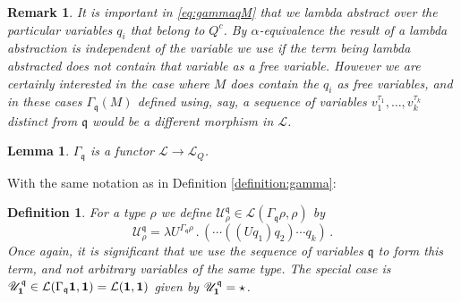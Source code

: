 \documentclass[english,letter paper,12pt,leqno]{article}
\def\be{\begin{equation}}
\def\ee{\end{equation}}
\def\ldot{\,.\,}
\newtheorem{lemma}[theorem]{Lemma}
\theoremstyle{example}
\newtheorem{definition}[theorem]{Definition}
\newtheorem{remark}[theorem]{Remark}
\numberwithin{equation}{section}
\newcommand{\call}[1]{\mathcal{#1}}
\def\be{\begin{equation}}
\def\ee{\end{equation}}
\def\ldot{\,.\,}
\begin{document}
\begin{remark} It is important in \eqref{eq:gammaqM} that we lambda abstract over the particular variables $q_i$ that belong to $Q^c$. By $\alpha$-equivalence the result of a lambda abstraction is independent of the variable we use \emph{if} the term being lambda abstracted does not contain that variable as a free variable. However we are certainly interested in the case where $M$ \emph{does} contain the $q_i$ as free variables, and in these cases $\Gamma_\mathfrak{q}(M)$ defined using, say, a sequence of variables $v_1^{\tau_1},\ldots,v_k^{\tau_k}$ distinct from $\mathfrak{q}$ would be a different morphism in $\call{L}$.
\end{remark}
\begin{lemma}\label{lem:gamfuncto} $\Gamma_\mathfrak{q}$ is a functor $\call{L} \longrightarrow \call{L}_Q$.
\end{lemma}
With the same notation as in Definition \ref{definition:gamma}:
\begin{definition}\label{defn:mathscru} For a type $\rho$ we define $\mathscr{U}^\mathfrak{q}_\rho \in \call{L}( \Gamma_\mathfrak{q} \rho, \rho )$ by
	\be
	\mathscr{U}^\mathfrak{q}_\rho = \lambda U^{\Gamma_\mathfrak{q} \rho} \ldot ( \cdots (( U q_1 ) q_2) \cdots q_k)\,.
	\ee
	Once again, it is significant that we use the sequence of variables $\mathfrak{q}$ to form this term, and not arbitrary variables of the same type. The special case is $\mathscr{U}^\mathfrak{q}_\bold{1} \in \call{L}(\Gamma_\mathfrak{q} \bold{1}, \bold{1}) = \call{L}(\bold{1}, \bold{1})$ given by $\mathscr{U}^\mathfrak{q}_\bold{1} = \star$.
\end{definition}
\end{document}
